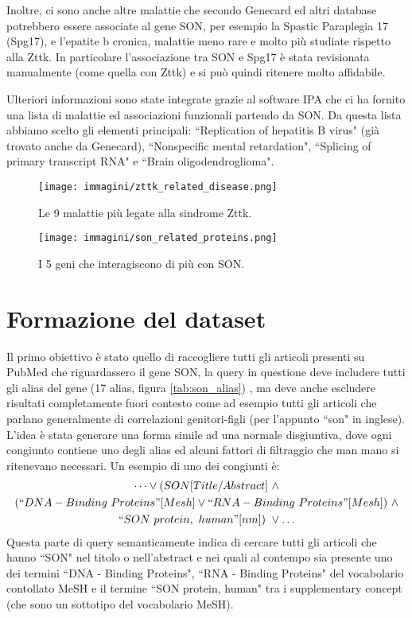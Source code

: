 \documentclass[12pt]{report}
\newcommand{\quotes}[1]{``#1"}
\begin{document}
Inoltre, ci sono anche altre malattie che secondo Genecard ed altri database potrebbero essere associate al gene SON, per esempio la Spastic Paraplegia 17 (Spg17), e l'epatite b cronica, malattie meno rare e molto più studiate rispetto alla Zttk. In particolare l'associazione tra SON e Spg17 è stata revisionata manualmente (come quella con Zttk) e si può quindi ritenere molto affidabile.

Ulteriori informazioni sono state integrate grazie al software IPA che ci ha fornito una lista di malattie ed associazioni funzionali partendo da SON. Da questa lista abbiamo scelto gli elementi principali: \quotes{Replication of hepatitis B virus} (già trovato anche da Genecard), \quotes{Nonspecific mental retardation}, \quotes{Splicing of primary transcript RNA} e \quotes{Brain oligodendroglioma}.


\begin{figure}[!htb]
\centering
\texttt{[image: immagini/zttk\_related\_disease.png]}
\caption{\footnotesize{Le 9 malattie più legate alla sindrome Zttk.}}
\label{fig:zttk_releted_disease}
\end{figure}

\begin{figure}[!htb]
\centering
\texttt{[image: immagini/son\_related\_proteins.png]}
\caption{\footnotesize{I 5 geni che interagiscono di più con SON.}}
\label{fig:son_related_proteins}
\end{figure}


\section{Formazione del dataset}
Il primo obiettivo è stato quello di raccogliere tutti gli articoli presenti su PubMed che riguardassero il gene SON, la query in questione deve includere tutti gli alias del gene (17 alias, figura \ref{tab:son_alias}) \cite{songene}, ma deve anche escludere risultati completamente fuori contesto come ad esempio tutti gli articoli che parlano generalmente di correlazioni genitori-figli (per l'appunto \quotes{son} in inglese). L'idea è stata generare una forma simile ad una normale disgiuntiva, dove ogni congiunto contiene uno degli alias ed alcuni fattori di filtraggio che man mano si ritenevano necessari. Un esempio di uno dei congiunti è:
\begin{gather}
\dots \lor (SON[Title/Abstract] \ \land  \\ 
\nonumber (\quotes{DNA-Binding \ Proteins}[Mesh] \lor \quotes{RNA-Binding \ Proteins} [Mesh]) \ \land \\
\nonumber \quotes{SON \ protein, \ human}[nm]) \ \lor \dots
\end{gather}
Questa parte di query semanticamente indica di cercare tutti gli articoli che hanno \quotes{SON} nel titolo o nell'abstract e nei quali al contempo sia presente uno dei termini \quotes{DNA - Binding Proteins}, \quotes{RNA - Binding Proteins} del vocabolario contollato MeSH e il termine \quotes{SON protein, human} tra i supplementary concept (che sono un sottotipo del vocabolario MeSH).
\end{document}

